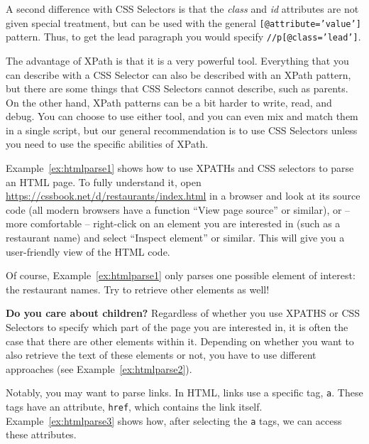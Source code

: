 A second difference with CSS Selectors is that the \emph{class} and \emph{id} attributes are not given special treatment,
but can be used with the general \texttt{\small{[@attribute='value']}} pattern.
Thus, to get the lead paragraph you would specify \texttt{\small{//p[@class='lead']}}.

The advantage of XPath is that it is a very powerful tool.
Everything that you can describe with a CSS Selector can also be described with an XPath pattern,
but there are some things that CSS Selectors cannot describe,
such as parents.
On the other hand, XPath patterns can be a bit harder to write, read, and debug.
You can choose to use either tool, and you can even mix and match them in a single script,
but our general recommendation is to use CSS Selectors unless you need to use the specific abilities of XPath.

Example~\ref{ex:htmlparse1} shows how to use XPATHs and CSS selectors to parse
an HTML page. To fully understand it, open
\url{https://cssbook.net/d/restaurants/index.html} in a browser and
look at its source code (all modern browsers have a function ``View
page source'' or similar), or -- more comfortable -- right-click on an
element you are interested in (such as a restaurant name) and select
``Inspect element'' or similar. This will give you a user-friendly
view of the HTML code.



Of course, Example~\ref{ex:htmlparse1} only parses one possible element of interest: the restaurant names. Try to retrieve other elements as well!

\begin{feature}\textbf{Do you care about children?}
Regardless of whether you use XPATHS or CSS Selectors to specify which part of the page you are interested in, it is often the case that there are other elements within it. Depending on whether you want to also retrieve the text of these elements or not, you have to use different approaches (see Example~\ref{ex:htmlparse2}).
\end{feature}



Notably, you may want to parse links. In HTML, links use a specific tag, \verb|a|. These tags have an attribute, \verb|href|, which contains the link itself. Example~\ref{ex:htmlparse3} shows how, after selecting the \verb|a| tags, we can access these attributes.

